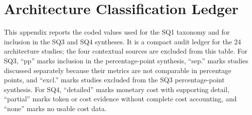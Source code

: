 \section{Architecture Classification Ledger}
\label{ap:classification-ledger}

This appendix reports the coded values used for the SQ1 taxonomy and
for inclusion in the SQ3 and SQ4 syntheses.
It is a compact audit ledger for the 24 architecture studies; the four
contextual sources are excluded from this table.
For SQ3, ``pp'' marks inclusion in the percentage-point synthesis,
``sep.'' marks studies discussed separately because their metrics are
not comparable in percentage points, and ``excl.'' marks studies
excluded from the SQ3 percentage-point synthesis.
For SQ4, ``detailed'' marks monetary cost with supporting detail,
``partial'' marks token or cost evidence without complete
cost accounting, and ``none'' marks no usable cost data.

